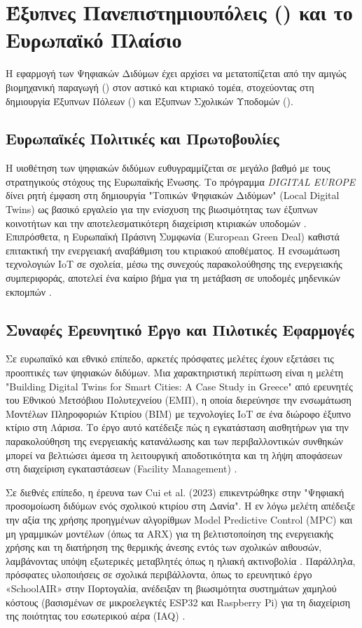 \section{Έξυπνες Πανεπιστημιουπόλεις () και το Ευρωπαϊκό Πλαίσιο}
Η εφαρμογή των Ψηφιακών Διδύμων έχει αρχίσει να μετατοπίζεται από την αμιγώς βιομηχανική παραγωγή () στον αστικό και κτιριακό τομέα, στοχεύοντας στη δημιουργία Έξυπνων Πόλεων () και Έξυπνων Σχολικών Υποδομών ().

\subsection{Ευρωπαϊκές Πολιτικές και Πρωτοβουλίες}
Η υιοθέτηση των ψηφιακών διδύμων ευθυγραμμίζεται σε μεγάλο βαθμό με τους στρατηγικούς στόχους της Ευρωπαϊκής Ένωσης. Το πρόγραμμα \textit{DIGITAL EUROPE} δίνει ρητή έμφαση στη δημιουργία "Τοπικών Ψηφιακών Διδύμων" (Local Digital Twins) ως βασικό εργαλείο για την ενίσχυση της βιωσιμότητας των έξυπνων κοινοτήτων και την αποτελεσματικότερη διαχείριση κτιριακών υποδομών \cite{DigitalEurope2023}. Επιπρόσθετα, η Ευρωπαϊκή Πράσινη Συμφωνία (European Green Deal) καθιστά επιτακτική την ενεργειακή αναβάθμιση του κτιριακού αποθέματος. Η ενσωμάτωση τεχνολογιών IoT σε σχολεία, μέσω της συνεχούς παρακολούθησης της ενεργειακής συμπεριφοράς, αποτελεί ένα καίριο βήμα για τη μετάβαση σε υποδομές μηδενικών εκπομπών \cite{IoTAnalytics2020}.

\subsection{Συναφές Ερευνητικό Έργο και Πιλοτικές Εφαρμογές}
Σε ευρωπαϊκό και εθνικό επίπεδο, αρκετές πρόσφατες μελέτες έχουν εξετάσει τις προοπτικές των ψηφιακών διδύμων. Μια χαρακτηριστική περίπτωση είναι η μελέτη "Building Digital Twins for Smart Cities: A Case Study in Greece" από ερευνητές του Εθνικού Μετσόβιου Πολυτεχνείου (ΕΜΠ), η οποία διερεύνησε την ενσωμάτωση Μοντέλων Πληροφοριών Κτιρίου (BIM) με τεχνολογίες IoT σε ένα διώροφο έξυπνο κτίριο στη Λάρισα. Το έργο αυτό κατέδειξε πώς η εγκατάσταση αισθητήρων για την παρακολούθηση της ενεργειακής κατανάλωσης και των περιβαλλοντικών συνθηκών μπορεί να βελτιώσει άμεσα τη λειτουργική αποδοτικότητα και τη λήψη αποφάσεων στη διαχείριση εγκαταστάσεων (Facility Management) \cite{Evangelou2022}.

Σε διεθνές επίπεδο, η έρευνα των Cui et al. (2023) επικεντρώθηκε στην "Ψηφιακή προσομοίωση διδύμων ενός σχολικού κτιρίου στη Δανία". Η εν λόγω μελέτη απέδειξε την αξία της χρήσης προηγμένων αλγορίθμων Model Predictive Control (MPC) και μη γραμμικών μοντέλων (όπως τα ARX) για τη βελτιστοποίηση της ενεργειακής χρήσης και τη διατήρηση της θερμικής άνεσης εντός των σχολικών αιθουσών, λαμβάνοντας υπόψη εξωτερικές μεταβλητές όπως η ηλιακή ακτινοβολία \cite{Cui2023}. Παράλληλα, πρόσφατες υλοποιήσεις σε σχολικά περιβάλλοντα, όπως το ερευνητικό έργο «SchoolAIR» στην Πορτογαλία, ανέδειξαν τη βιωσιμότητα συστημάτων χαμηλού κόστους (βασισμένων σε μικροελεγκτές ESP32 και Raspberry Pi) για τη διαχείριση της ποιότητας του εσωτερικού αέρα (IAQ) \cite{Balla2023, Agca2023}.

